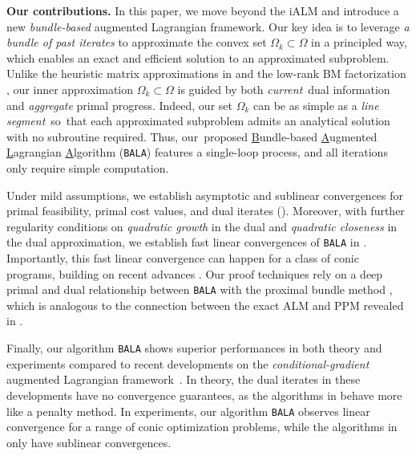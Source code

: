 \documentclass[11pt]{article}
\newcommand{\alg}{\texttt{BALA}}%
\begin{document}
\vspace{3pt}

\noindent \textbf{Our contributions.}  
In this paper, we move beyond the iALM and introduce a new \textit{bundle-based} augmented Lagrangian framework. 
Our key idea is to leverage \textit{a bundle of past iterates} to approximate the convex set $\Omega_k \subset \Omega$ in a principled way, which enables an exact and efficient solution to an approximated subproblem. Unlike the heuristic matrix approximations in \cite{ahmadi2017sum,zheng2022block,liao2022iterative} and the low-rank BM factorization \cite{burer2003nonlinear}, our inner approximation $\Omega_k \subset \Omega$ is guided by both \textit{current}~dual information and \textit{aggregate} primal progress. Indeed, our set $\Omega_k$ can be as simple as a \textit{line segment}~so~that each approximated subproblem admits an analytical solution with no subroutine required. Thus, our~proposed \underline{B}undle-based \underline{A}ugmented \underline{L}agrangian \underline{A}lgorithm (\texttt{BALA}) features a single-loop process, and all iterations only require simple computation. 

Under mild assumptions, we establish asymptotic and sublinear convergences for primal feasibility, primal cost values, and dual iterates (). Moreover, with further regularity conditions on \textit{quadratic growth} in the dual and \textit{quadratic closeness} in the dual approximation, we establish fast linear convergences of \alg{} in .  Importantly, this fast linear convergence can happen for a class of conic programs, building on recent advances \cite{ding2023revisiting,liao2024inexact}.  
% 
Our proof techniques rely on a deep primal and dual relationship between \alg{} with the proximal bundle method \cite{diaz2023optimal}, which is analogous to the connection between the exact ALM and PPM revealed in \cite{rockafellar1976augmented}. 

Finally, our algorithm \alg{} shows superior performances in both theory and experiments compared to recent developments on the \textit{conditional-gradient} augmented Lagrangian framework~\cite{yurtsever2019conditional,yurtsever2021scalable,garber2023faster}. In theory, the dual iterates in these developments have no convergence guarantees, as the algorithms in  \cite{yurtsever2019conditional,yurtsever2021scalable,garber2023faster} behave more like a penalty method. In experiments, our algorithm \alg{} observes linear convergence for a range of conic optimization problems, while the algorithms in \cite{yurtsever2019conditional,yurtsever2021scalable,garber2023faster} only have sublinear convergences. 
\end{document}
